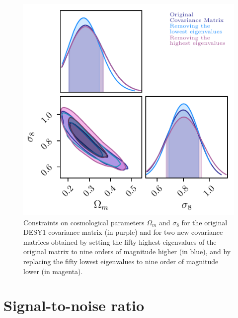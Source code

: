 \documentclass[twocolumn]{\docclass}
\begin{document}
 
	
	
	\begin{figure}
		\includegraphics[width=0.9\columnwidth]{Eigenvalues/Eigenvalues_wm-sigma8.pdf}
		\caption{Constraints on cosmological parameters $\Omega_m$ and $\sigma_8$ for the original DESY1 covariance matrix (in purple) and for two new covariance matrices obtained by setting the fifty highest eigenvalues of the original matrix to nine orders of magnitude higher (in blue), and by replacing the fifty lowest eigenvalues to nine order of magnitude lower (in magenta). \label{fig:eigenvalues}}
	\end{figure}
	
	
	\section{Signal-to-noise ratio}
	
\end{document}

